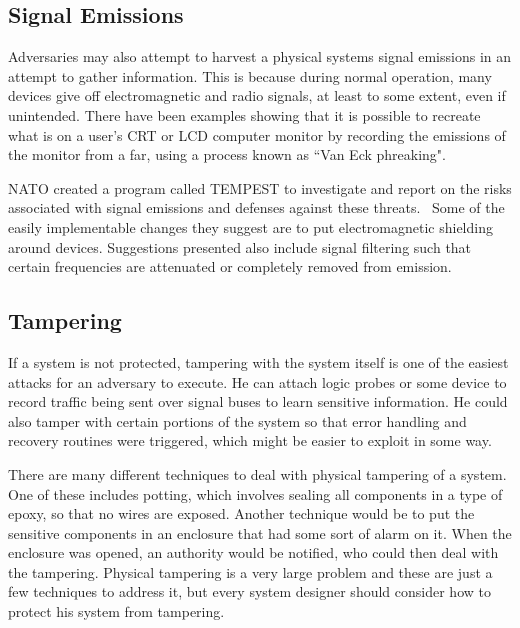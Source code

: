 \subsection{Signal Emissions}
Adversaries may also attempt to harvest a physical systems signal emissions in an attempt to gather information. This is because during
normal operation, many devices give off electromagnetic and radio signals, at least to some extent, even if unintended. There have been
examples showing that it is possible to recreate what is on a user's CRT or LCD computer monitor by recording the emissions of the monitor
from a far, using a process known as ``Van Eck phreaking".~\cite{monitor}~\cite{lcds}

NATO created a program called TEMPEST to investigate and report on the risks associated with signal emissions and defenses
against these threats.~\cite{tempest} Some of the easily implementable changes they suggest are to put electromagnetic shielding
around devices. Suggestions presented also include signal filtering such that certain frequencies are attenuated or completely removed
from emission.

\subsection{Tampering}
If a system is not protected, tampering with the system itself is one of the easiest attacks for an adversary to execute.
He can attach logic probes or some device to record traffic being sent over signal buses to learn sensitive information.
He could also tamper with certain portions of the system so that error handling and recovery routines were triggered,
which might be easier to exploit in some way.

There are many different techniques to deal with physical tampering of a system. One of these includes potting, which 
involves sealing all components in a type of epoxy, so that no wires are exposed. Another technique would be to
put the sensitive components in an enclosure that had some sort of alarm on it. When the enclosure was opened, an
authority would be notified, who could then deal with the tampering. Physical tampering is a very large problem
and these are just a few techniques to address it, but every system designer should consider how to protect his
system from tampering.
